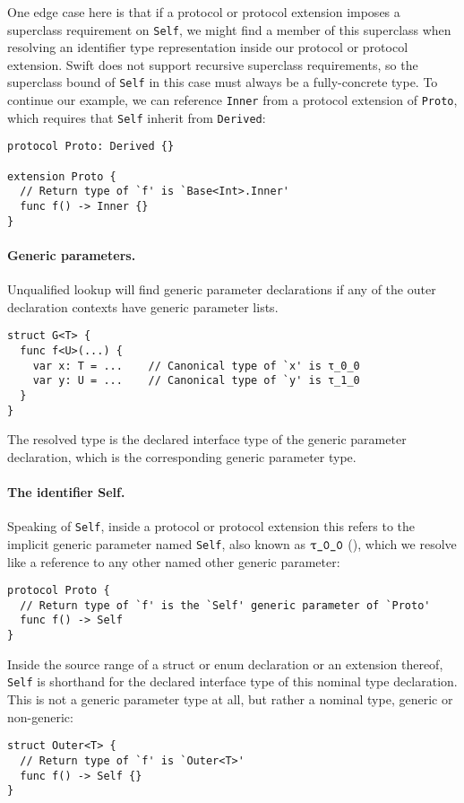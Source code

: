 \documentclass[../generics]{subfiles}
\begin{document}
One edge case here is that if a protocol or protocol extension imposes a superclass requirement on \texttt{Self}, we might find a member of this superclass when resolving an identifier type representation inside our protocol or protocol extension. Swift does not support recursive superclass requirements, so the superclass bound of \texttt{Self} in this case must always be a fully-concrete type. To continue our example, we can reference \texttt{Inner} from a protocol extension of \texttt{Proto}, which requires that \texttt{Self} inherit from \texttt{Derived}:
\begin{Verbatim}
protocol Proto: Derived {}

extension Proto {
  // Return type of `f' is `Base<Int>.Inner'
  func f() -> Inner {}
}
\end{Verbatim}

\paragraph{Generic parameters.}
Unqualified lookup will find generic parameter declarations if any of the outer declaration contexts have generic parameter lists.
\begin{Verbatim}
struct G<T> {
  func f<U>(...) {
    var x: T = ...    // Canonical type of `x' is τ_0_0
    var y: U = ...    // Canonical type of `y' is τ_1_0
  }
}
\end{Verbatim}
The resolved type is the declared interface type of the generic parameter declaration, which is the corresponding generic parameter type.

\paragraph{The identifier Self.}
Speaking of \texttt{Self}, inside a protocol or protocol extension this refers to the implicit generic parameter named \texttt{Self}, also known as $\rT$ (), which we resolve like a reference to any other named other generic parameter:
\begin{Verbatim}
protocol Proto {
  // Return type of `f' is the `Self' generic parameter of `Proto'
  func f() -> Self
}
\end{Verbatim}

Inside the source range of a struct or enum declaration or an extension thereof, \texttt{Self} is shorthand for the declared interface type of this nominal type declaration. This is not a generic parameter type at all, but rather a nominal type, generic or non-generic:
\begin{Verbatim}
struct Outer<T> {
  // Return type of `f' is `Outer<T>'
  func f() -> Self {}
}
\end{Verbatim}
\end{document}
